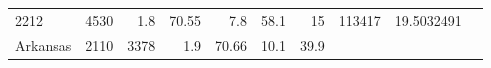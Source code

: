 \documentclass[]{article}
\begin{document}
\begin{longtable}[]{@{}lrrrrrrrrr@{}}
\begin{minipage}[t]{0.08\columnwidth}
2212\strut
\end{minipage} & \begin{minipage}[t]{0.07\columnwidth}\raggedleft\strut
4530\strut
\end{minipage} & \begin{minipage}[t]{0.10\columnwidth}\raggedleft\strut
1.8\strut
\end{minipage} & \begin{minipage}[t]{0.07\columnwidth}\raggedleft\strut
70.55\strut
\end{minipage} & \begin{minipage}[t]{0.05\columnwidth}\raggedleft\strut
7.8\strut
\end{minipage} & \begin{minipage}[t]{0.07\columnwidth}\raggedleft\strut
58.1\strut
\end{minipage} & \begin{minipage}[t]{0.06\columnwidth}\raggedleft\strut
15\strut
\end{minipage} & \begin{minipage}[t]{0.05\columnwidth}\raggedleft\strut
113417\strut
\end{minipage} & \begin{minipage}[t]{0.10\columnwidth}\raggedleft\strut
19.5032491\strut
\end{minipage}\tabularnewline
\begin{minipage}[t]{0.08\columnwidth}\raggedright\strut
Arkansas\strut
\end{minipage} & \begin{minipage}[t]{0.08\columnwidth}\raggedleft\strut
2110\strut
\end{minipage} & \begin{minipage}[t]{0.07\columnwidth}\raggedleft\strut
3378\strut
\end{minipage} & \begin{minipage}[t]{0.10\columnwidth}\raggedleft\strut
1.9\strut
\end{minipage} & \begin{minipage}[t]{0.07\columnwidth}\raggedleft\strut
70.66\strut
\end{minipage} & \begin{minipage}[t]{0.05\columnwidth}\raggedleft\strut
10.1\strut
\end{minipage} & \begin{minipage}[t]{0.07\columnwidth}\raggedleft\strut
39.9\strut
\end{minipage} & \begin{minipage}[t]{0.06\columnwidth}\raggedleft\strut

\end{minipage}
\end{longtable}
\end{document}
